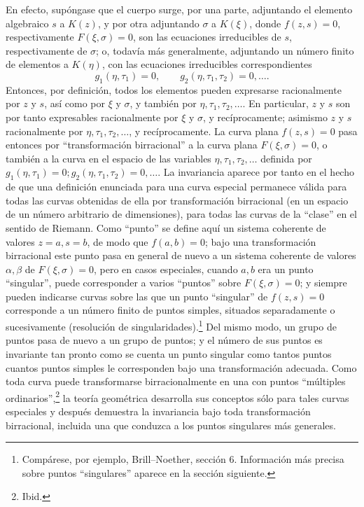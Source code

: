 \documentclass[11pt]{article}
\begin{document}
En efecto, supóngase que el cuerpo surge, por una parte, adjuntando el elemento algebraico \(s\) a \(K(z)\), y por otra adjuntando \(\sigma\) a \(K(\xi)\), donde \(f(z,s)=0\), respectivamente \(F(\xi,\sigma)=0\), son las ecuaciones irreducibles de \(s\), respectivamente de \(\sigma\); o, todavía más generalmente, adjuntando un número finito de elementos a \(K(\eta)\), con las ecuaciones irreducibles correspondientes
\[
g_1(\eta,\tau_1)=0,\qquad g_2(\eta,\tau_1,\tau_2)=0,\ldots .
\]
Entonces, por definición, todos los elementos pueden expresarse racionalmente por \(z\) y \(s\), así como por \(\xi\) y \(\sigma\), y también por \(\eta,\tau_1,\tau_2,\ldots\). En particular, \(z\) y \(s\) son por tanto expresables racionalmente por \(\xi\) y \(\sigma\), y recíprocamente; asimismo \(z\) y \(s\) racionalmente por \(\eta,\tau_1,\tau_2,\ldots\), y recíprocamente. La curva plana \(f(z,s)=0\) pasa entonces por ``transformación birracional'' a la curva plana \(F(\xi,\sigma)=0\), o también a la curva en el espacio de las variables \(\eta,\tau_1,\tau_2,\ldots\) definida por \(g_1(\eta,\tau_1)=0; g_2(\eta,\tau_1,\tau_2)=0,\ldots\). La invariancia aparece por tanto en el hecho de que una definición enunciada para una curva especial permanece válida para todas las curvas obtenidas de ella por transformación birracional (en un espacio de un número arbitrario de dimensiones), para todas las curvas de la ``clase'' en el sentido de Riemann. Como ``punto'' se define aquí un sistema coherente de valores \(z=a,s=b\), de modo que \(f(a,b)=0\); bajo una transformación birracional este punto pasa en general de nuevo a un sistema coherente de valores \(\alpha,\beta\) de \(F(\xi,\sigma)=0\), pero en casos especiales, cuando \(a,b\) era un punto ``singular'', puede corresponder a varios ``puntos'' sobre \(F(\xi,\sigma)=0\); y siempre pueden indicarse curvas sobre las que un punto ``singular'' de \(f(z,s)=0\) corresponde a un número finito de puntos simples, situados separadamente o sucesivamente (resolución de singularidades).\footnote{Compárese, por ejemplo, Brill--Noether, sección 6. Información más precisa sobre puntos ``singulares'' aparece en la sección siguiente.} Del mismo modo, un grupo de puntos pasa de nuevo a un grupo de puntos; y el número de sus puntos es invariante tan pronto como se cuenta un punto singular como tantos puntos cuantos puntos simples le corresponden bajo una transformación adecuada. Como toda curva puede transformarse birracionalmente en una con puntos ``múltiples ordinarios'',\footnote{Ibid.} la teoría geométrica desarrolla sus conceptos sólo para tales curvas especiales y después demuestra la invariancia bajo toda transformación birracional, incluida una que conduzca a los puntos singulares más generales.
\end{document}
